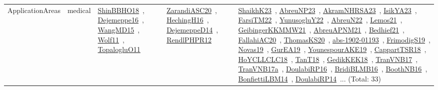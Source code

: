 {\begin{longtable}{lp{3cm}>{\raggedright\arraybackslash}p{6cm}>{\raggedright\arraybackslash}p{6cm}>{\raggedright\arraybackslash}p{8cm}}
ApplicationAreas & medical & \href{works/ShinBBHO18.pdf}{ShinBBHO18}~\cite{ShinBBHO18}, \href{works/Dejemeppe16.pdf}{Dejemeppe16}~\cite{Dejemeppe16}, \href{works/WangMD15.pdf}{WangMD15}~\cite{WangMD15}, \href{works/Wolf11.pdf}{Wolf11}~\cite{Wolf11}, \href{works/TopalogluO11.pdf}{TopalogluO11}~\cite{TopalogluO11} & \href{works/ZarandiASC20.pdf}{ZarandiASC20}~\cite{ZarandiASC20}, \href{works/HechingH16.pdf}{HechingH16}~\cite{HechingH16}, \href{works/DejemeppeD14.pdf}{DejemeppeD14}~\cite{DejemeppeD14}, \href{works/RendlPHPR12.pdf}{RendlPHPR12}~\cite{RendlPHPR12} & \href{works/ShaikhK23.pdf}{ShaikhK23}~\cite{ShaikhK23}, \href{works/AbreuNP23.pdf}{AbreuNP23}~\cite{AbreuNP23}, \href{works/AkramNHRSA23.pdf}{AkramNHRSA23}~\cite{AkramNHRSA23}, \href{works/IsikYA23.pdf}{IsikYA23}~\cite{IsikYA23}, \href{works/FarsiTM22.pdf}{FarsiTM22}~\cite{FarsiTM22}, \href{works/YunusogluY22.pdf}{YunusogluY22}~\cite{YunusogluY22}, \href{works/AbreuN22.pdf}{AbreuN22}~\cite{AbreuN22}, \href{works/Lemos21.pdf}{Lemos21}~\cite{Lemos21}, \href{works/GeibingerKKMMW21.pdf}{GeibingerKKMMW21}~\cite{GeibingerKKMMW21}, \href{works/AbreuAPNM21.pdf}{AbreuAPNM21}~\cite{AbreuAPNM21}, \href{works/Bedhief21.pdf}{Bedhief21}~\cite{Bedhief21}, \href{works/FallahiAC20.pdf}{FallahiAC20}~\cite{FallahiAC20}, \href{works/ThomasKS20.pdf}{ThomasKS20}~\cite{ThomasKS20}, \href{works/abs-1902-01193.pdf}{abs-1902-01193}~\cite{abs-1902-01193}, \href{works/FrimodigS19.pdf}{FrimodigS19}~\cite{FrimodigS19}, \href{works/Novas19.pdf}{Novas19}~\cite{Novas19}, \href{works/GurEA19.pdf}{GurEA19}~\cite{GurEA19}, \href{works/YounespourAKE19.pdf}{YounespourAKE19}~\cite{YounespourAKE19}, \href{works/CappartTSR18.pdf}{CappartTSR18}~\cite{CappartTSR18}, \href{works/HoYCLLCLC18.pdf}{HoYCLLCLC18}~\cite{HoYCLLCLC18}, \href{works/TanT18.pdf}{TanT18}~\cite{TanT18}, \href{works/GedikKEK18.pdf}{GedikKEK18}~\cite{GedikKEK18}, \href{works/TranVNB17.pdf}{TranVNB17}~\cite{TranVNB17}, \href{works/TranVNB17a.pdf}{TranVNB17a}~\cite{TranVNB17a}, \href{works/DoulabiRP16.pdf}{DoulabiRP16}~\cite{DoulabiRP16}, \href{works/BridiBLMB16.pdf}{BridiBLMB16}~\cite{BridiBLMB16}, \href{works/BoothNB16.pdf}{BoothNB16}~\cite{BoothNB16}, \href{works/BonfiettiLBM14.pdf}{BonfiettiLBM14}~\cite{BonfiettiLBM14}, \href{works/DoulabiRP14.pdf}{DoulabiRP14}~\cite{DoulabiRP14}... (Total: 33)\\

\end{longtable}}
